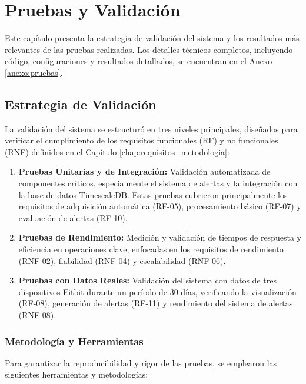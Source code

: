 \chapter{Pruebas y Validación}
\label{chap:pruebas_validacion}

Este capítulo presenta la estrategia de validación del sistema y los resultados más relevantes de las pruebas realizadas. Los detalles técnicos completos, incluyendo código, configuraciones y resultados detallados, se encuentran en el Anexo \ref{anexo:pruebas}.

\section{Estrategia de Validación}
\label{sec:estrategia_validacion}

La validación del sistema se estructuró en tres niveles principales, diseñados para verificar el cumplimiento de los requisitos funcionales (RF) y no funcionales (RNF) definidos en el Capítulo \ref{chap:requisitos_metodologia}:

\begin{enumerate}
    \item \textbf{Pruebas Unitarias y de Integración:} Validación automatizada de componentes críticos, especialmente el sistema de alertas y la integración con la base de datos TimescaleDB. Estas pruebas cubrieron principalmente los requisitos de adquisición automática (RF-05), procesamiento básico (RF-07) y evaluación de alertas (RF-10).
    \item \textbf{Pruebas de Rendimiento:} Medición y validación de tiempos de respuesta y eficiencia en operaciones clave, enfocadas en los requisitos de rendimiento (RNF-02), fiabilidad (RNF-04) y escalabilidad (RNF-06).
    \item \textbf{Pruebas con Datos Reales:} Validación del sistema con datos de tres dispositivos Fitbit durante un período de 30 días, verificando la visualización (RF-08), generación de alertas (RF-11) y rendimiento del sistema de alertas (RNF-08).
\end{enumerate}

\subsection{Metodología y Herramientas}
\label{subsec:metodologia_pruebas}

Para garantizar la reproducibilidad y rigor de las pruebas, se emplearon las siguientes herramientas y metodologías:

